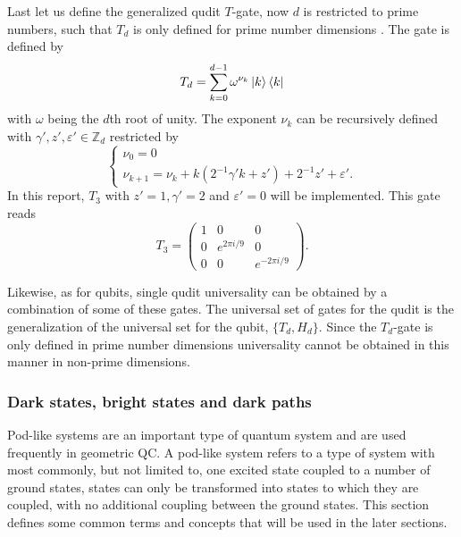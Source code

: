 Last let us define the generalized qudit $T$-gate, now $d$ is restricted to prime numbers, such that $T_d$ is only defined for prime number dimensions \cite{8gate}. 
The gate is defined by
\begin{equation}
T_d = \sum_{k=0}^{d-1} \omega^{\nu_k}\ket{k}\bra{k}
\end{equation}
with $\omega$ being the $d$th root of unity. The exponent $\nu_k$ can be recursively defined with $\gamma',z',\varepsilon' \in \mathbb{Z}_d$ restricted by
\begin{equation}
\begin{cases}
\nu_0 = 0\\
\nu_{k+1} = \nu_k + k(2^{-1}\gamma'k + z') + 2^{-1}z' + \varepsilon'.
\end{cases}
\end{equation} 
In this report, $T_3$ with $z' = 1, \gamma' = 2$ and $\varepsilon' = 0$ will be implemented. This gate reads 
\begin{equation}
T_3 = \begin{pmatrix}
1 & 0 & 0\\
0 & e^{2\pi i/9}& 0 \\
0 & 0 & e^{-2\pi i /9}
\end{pmatrix}.
\end{equation}

Likewise, as for qubits, single qudit universality can be obtained by a combination of some of these gates. The universal set of gates for the qudit is the generalization of the universal set for the qubit, $\{T_d, H_d\}$. Since the $T_d$-gate is only defined in prime number dimensions universality cannot be obtained in this manner in non-prime dimensions.




\subsubsection{Dark states, bright states and dark paths}
Pod-like systems are an important type of quantum system and are used frequently in geometric QC. A pod-like system refers to a type of system with most commonly, but not limited to, one excited state coupled to a number of ground states, states can only be transformed into states to which they are coupled, with no additional coupling between the ground states. This section defines some common terms and concepts that will be used in the later sections.


